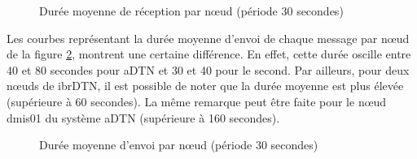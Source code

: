 \documentclass[a4paper,10pt]{article}
\begin{document}
\begin{figure}[h!]
    \centering
    \caption{Durée moyenne de réception par nœud (période 30 secondes)}
    \label{fig:30_avg_rcv_duration}
\end{figure}

Les courbes représentant la durée moyenne d’envoi de chaque message par nœud de la figure \ref{fig:30_avg_snd_duration}, montrent une certaine différence. En effet, cette durée oscille entre 40 et 80 secondes pour aDTN et 30 et 40 pour le second. Par ailleurs, pour deux nœuds de ibrDTN, il est possible de noter que la durée moyenne est plus élevée (supérieure à 60 secondes). La même remarque peut être faite pour le nœud dmis01 du système aDTN (supérieure à 160 secondes).\par

\begin{figure}[h!]
    \centering
    \caption{Durée moyenne d'envoi par nœud (période 30 secondes)}
    \label{fig:30_avg_snd_duration}
\end{figure}
\end{document}
